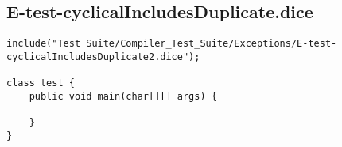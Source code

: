 \subsection{E-test-cyclicalIncludesDuplicate.dice}
\begin{verbatim}
include("Test Suite/Compiler_Test_Suite/Exceptions/E-test-cyclicalIncludesDuplicate2.dice");

class test {
	public void main(char[][] args) {
        
	}
}

\end{verbatim}